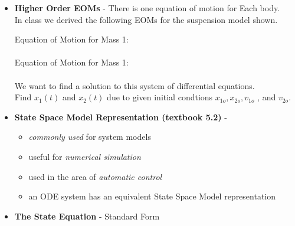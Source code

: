 \documentclass[11pt]{article}
\begin{document}
\begin{itemize}
\item \textbf{ \Large Higher Order EOMs} - There is one equation of motion for Each body. \\ In class we derived the following EOMs for the suspension model shown. \\
\Large

	
	Equation of Motion for Mass 1: \\

	 \vspace{5mm}\\

	Equation of Motion for Mass 1: \\

	 \vspace{5mm}\\

	We want to find a solution to this system of differential equations. \\ Find $x_1(t)$ and $x_2(t)$ due to given initial condtions $x_{1o}, x_{2o}, v_{1o}$ , and $v_{2o}$.\\

\item \textbf{ \Large State Space Model Representation (textbook 5.2) } - 

	\begin{itemize}

		\item {\it commonly used} for system models \\

		\item useful for {\it numerical simulation}\\

		\item used in the area of {\it automatic control}\\

		\item an ODE system has an equivalent State Space Model representation\\

	\end{itemize}

\item \textbf{ \Large The State Equation} - Standard Form \\\\

	 \vspace{0mm}\\


\end{itemize}
\end{document}
